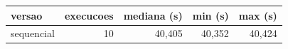 \begin{tabular}{lrrrr}
\toprule
versao & execucoes & mediana (s) & min (s) & max (s) \\
\midrule
sequencial & 10 & 40,405 & 40,352 & 40,424 \\
\bottomrule
\end{tabular}
